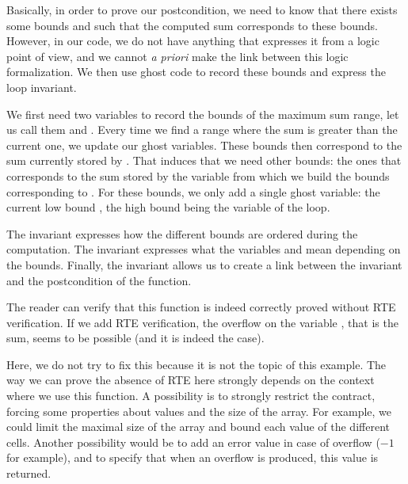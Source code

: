 Basically, in order to prove our postcondition, we need to know that there
exists some bounds
 and  such that the computed sum corresponds to
these bounds. However, in our code, we do not have anything that expresses
it from a logic point of view, and we cannot \emph{a priori} make the
link between this logic formalization. We then use ghost code to
record these bounds and express the loop invariant.


We first need two variables to record the bounds
of the maximum sum range, let us call them  and
. Every time we find a range where the sum is greater
than the current one, we update our ghost variables. These bounds
then correspond to the sum currently stored by . That
induces that we need other bounds: the ones that corresponds to the sum
stored by the variable  from which we build the bounds
corresponding to . For these bounds, we only add a
single ghost variable: the current low bound , the high
bound being the variable  of the loop.






The invariant  expresses how the different bounds are
ordered during the computation. The invariant  expresses
what the variables  and  mean depending on the
bounds. Finally, the invariant  allows us to create a link
between the invariant and the postcondition of the function.



The reader can verify that this function is indeed correctly proved
without RTE verification. If we add RTE verification, the overflow on
the variable , that is the sum, seems to be possible (and it
is indeed the case).



Here, we do not try to fix this because it is not the topic of this
example. The way we can prove the absence of RTE here strongly depends
on the context where we use this function. A possibility is to strongly
restrict the contract, forcing some properties about values and the size
of the array. For example, we could limit the maximal size of the array
and bound each value of the different cells. Another possibility would be to
add an error value in case of overflow
(\(-1\) for example), and to specify that when an overflow is produced,
this value is returned.




